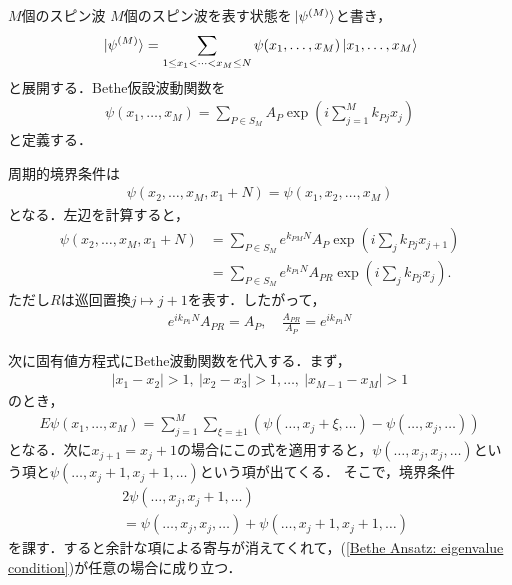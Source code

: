 \documentclass[dvipdfmx,9pt]{beamer}
\numberwithin{equation}{section}
\begin{document}
\begin{frame}{$M$個のスピン波}
    $M$個のスピン波を表す状態を$\ket*{\psi^{(M)}}$と書き，
    \begin{align}
        \ket*{\psi^{(M)}} = \sum_{1\le x_1 < \cdots < x_M \le N}  \psi(x_1,\ldots,x_M) \ket{x_1,\ldots,x_M}
    \end{align}
    と展開する．Bethe仮設波動関数を
    \begin{align}
        \psi(x_1,\ldots,x_M) = \sum_{P \in S_M} A_P \exp(i \sum_{j=1}^M k_{Pj} x_j)
    \end{align}
    と定義する．
\end{frame}
\begin{frame}
    周期的境界条件は
    \begin{align}
        \psi(x_2,\ldots,x_M,x_1+N) = \psi(x_1,x_2,\ldots,x_M)
    \end{align}
    となる．左辺を計算すると，
    \begin{align}
        \psi(x_2,\ldots,x_M,x_1+N)
        &
        = \sum_{P \in S_M} e^{k_{PM}N} A_P \exp(i \sum_j k_{Pj}x_{j+1})
        \\ &
        = \sum_{P \in S_M} e^{k_{P1}N} A_{PR} \exp(i \sum_j k_{Pj}x_j).
    \end{align}
    ただし$R$は巡回置換$j \mapsto j+1$を表す．したがって，
    \begin{align}
        e^{i k_{P1}N}A_{PR} = A_P,
        \quad
        \frac{A_{PR}}{A_P} = e^{i k_{P1}N}
    \end{align}
\end{frame}

\begin{frame}
    次に固有値方程式にBethe波動関数を代入する．まず，
    \begin{align}
        |x_1-x_2|>1,~ |x_2-x_3|>1,\ldots,~ |x_{M-1}-x_M|>1
    \end{align}
    のとき，
    \begin{align}
        E\psi(x_1,\ldots,x_M) = 
        \sum_{j=1}^M \sum_{\xi=\pm 1} (\psi(\ldots,x_j+\xi,\ldots)-\psi(\ldots,x_j,\ldots))
        \label{Bethe Ansatz: eigenvalue condition}
    \end{align}
    となる．次に$x_{j+1}=x_j+1$の場合にこの式を適用すると，$\psi(\ldots,x_j,x_j,\ldots)$という項と$\psi(\ldots,x_j+1,x_j+1,\ldots)$という項が出てくる．
    そこで，境界条件
    \begin{align}
        & \nonumber
        2\psi(\ldots,x_j,x_j+1,\ldots)
        \\ &
        = \psi(\ldots,x_j,x_j,\ldots)+ \psi(\ldots,x_j+1,x_j+1,\ldots)
        \label{Bethe Ansatz: M particle boundary condition}
    \end{align}
    を課す．すると余計な項による寄与が消えてくれて，(\ref{Bethe Ansatz: eigenvalue condition})が任意の場合に成り立つ．
\end{frame}
\end{document}
